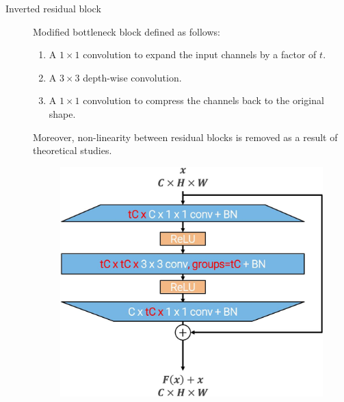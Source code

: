 \begin{description}
    \item[Inverted residual block] 
        Modified bottleneck block defined as follows:
        \begin{enumerate}
            \item A $1 \times 1$ convolution to expand the input channels by a factor of $t$. 
            \item A $3 \times 3$ depth-wise convolution.
            \item A $1 \times 1$ convolution to compress the channels back to the original shape.
        \end{enumerate}
        Moreover, non-linearity between residual blocks is removed as a result of theoretical studies.

        \begin{figure}[H]
            \centering
            \includegraphics[width=0.4\linewidth]{./img/_inverted_residual.jpg}
        \end{figure}
\end{description}

